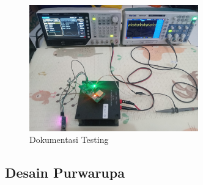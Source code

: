 \documentclass{book} %
\begin{document}
	\newpage
	\begin{figure}[h]
		\centering
		\includegraphics[width=0.65\textwidth]{images/testactual.jpg}
		\caption{Dokumentasi Testing}
	\end{figure}
	
	\subsection{Desain Purwarupa}
	
	
	
\end{document}
